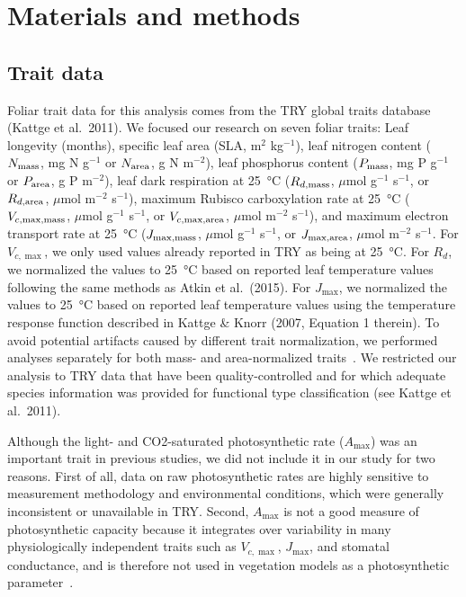 \section{Materials and methods}\label{sec:mvtraits-methods}

\subsection{Trait data}

Foliar trait data for this analysis comes from the TRY global traits database (Kattge et al.~2011). \nocite{kattge_try_2011}
We focused our research on seven foliar traits:
Leaf longevity (months),
specific leaf area (SLA, m$^2$ kg$^{-1}$),
leaf nitrogen content ($N_{\text{mass}}$, mg N g$^{-1}$ or $N_{\text{area}}$, g N m$^{-2}$),
leaf phosphorus content ($P_{\text{mass}}$, mg P g$^{-1}$ or $P_{\text{area}}$, g P m$^{-2}$),
leaf dark respiration at \SI{25}{\degreeCelsius} ($R_{d,\text{mass}}$, $\mu$mol g$^{-1}$ s$^{-1}$, or $R_{d,\text{area}}$, $\mu$mol m$^{-2}$ s$^{-1}$),
maximum Rubisco carboxylation rate at \SI{25}{\degreeCelsius} ($V_{c,\max,\text{mass}}$, $\mu$mol g$^{-1}$ s$^{-1}$, or $V_{c,\max,\text{area}}$, $\mu$mol m$^{-2}$ s$^{-1}$),
and maximum electron transport rate at \SI{25}{\degreeCelsius} ($J_{\max,\text{mass}}$, $\mu$mol g$^{-1}$ s$^{-1}$, or $J_{\max,\text{area}}$, $\mu$mol m$^{-2}$ s$^{-1}$.
For $V_{c,\max}$, we only used values already reported in TRY as being at \SI{25}{\degreeCelsius}.
For $R_{d}$, we normalized the values to \SI{25}{\degreeCelsius} based on reported leaf temperature values following the same methods as Atkin et al.~(2015). \nocite{atkin_global_2015}
For $J_{\max}$, we normalized the values to \SI{25}{\degreeCelsius} based on reported leaf temperature values using the temperature response function described in Kattge \& Knorr (2007, Equation 1 therein). \nocite{kattge_2007_temperature}
To avoid potential artifacts caused by different trait normalization, we performed analyses separately for both mass- and area-normalized traits~\cite{osnas_global_2013,lloyd_les}.
We restricted our analysis to TRY data that have been quality-controlled and for which adequate species information was provided for functional type classification (see Kattge et al.~2011).\nocite{kattge_try_2011}

Although the light- and CO2-saturated photosynthetic rate ($A_{\max}$) was an important trait in previous studies, we did not include it in our study for two reasons.
First of all, data on raw photosynthetic rates are highly sensitive to measurement methodology and environmental conditions, which were generally inconsistent or unavailable in TRY\@.
Second, $A_{\max}$ is not a good measure of photosynthetic capacity because it integrates over variability in many physiologically independent traits such as $V_{c,\max}$, $J_{\max}$, and stomatal conductance, and is therefore not used in vegetation models as a photosynthetic parameter~\cite{Ali_2015}.

